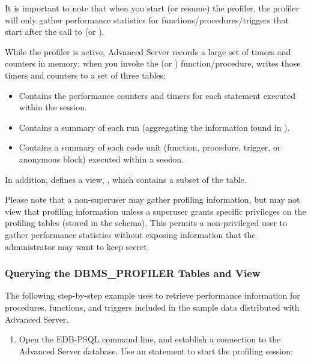 \documentclass[letterpaper,10pt,english,openany,oneside]{sphinxmanual}
\begin{document}
It is important to note that when you start (or resume) the profiler,
the profiler will only gather performance statistics for
functions/procedures/triggers that start after the call to
 (or ).

While the profiler is active, Advanced Server records a large set of
timers and counters in memory; when you invoke the  (or
) function/procedure,  writes those timers and
counters to a set of three tables:
\begin{itemize}
\item {} 

Contains the performance counters and timers for each statement
executed within the session.

\item {} 

Contains a summary of each run (aggregating the information found
in ).

\item {} 

Contains a summary of each code unit (function, procedure, trigger,
or anonymous block) executed within a session.

\end{itemize}

In addition,  defines a view, ,
which contains a subset of the  table.

Please note that a non-superuser may gather profiling information, but
may not view that profiling information unless a superuser grants
specific privileges on the profiling tables (stored in the  schema).
This permits a non-privileged user to gather performance statistics
without exposing information that the administrator may want to keep
secret.

\newpage


\subsubsection{Querying the DBMS\_PROFILER Tables and View}
\label{\detokenize{dbms_profiler:querying-the-dbms-profiler-tables-and-view}}
The following step-by-step example uses  to retrieve
performance information for procedures, functions, and triggers included
in the sample data distributed with Advanced Server.
\begin{enumerate}
\item {} 
Open the EDB-PSQL command line, and establish a connection to the
Advanced Server database. Use an  statement to start the
profiling session:

\end{enumerate}
\end{document}
